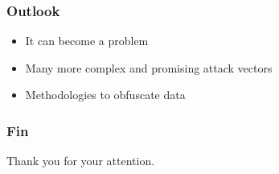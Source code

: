 \documentclass[t]{beamer}
\begin{document}
\begin{frame}
    \frametitle{Outlook}
    \begin{itemize}
        \item It can become a problem
        \pause{}
        \item Many more complex and promising attack vectors
        \pause{}
        \item Methodologies to obfuscate data
    \end{itemize}
\end{frame}


\begin{frame}
    \frametitle{Fin}
    Thank you for your attention.
\end{frame}
\end{document}
